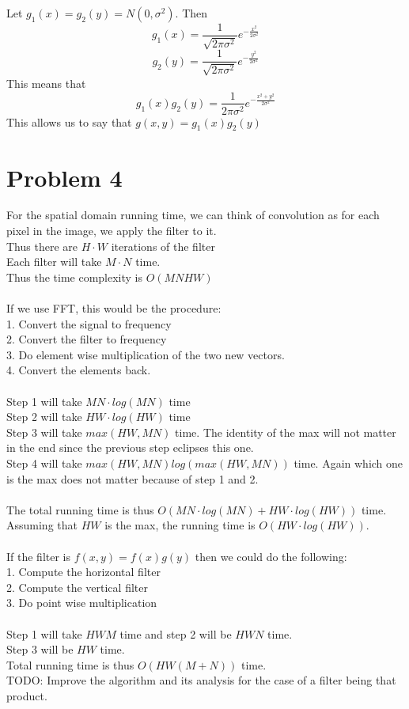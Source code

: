 \documentclass[11pt,psfig]{article}
\begin{document}
Let $g_1(x) = g_2(y) = N(0,\sigma^2)$. Then
\[
g_1(x) = \frac{1}{\sqrt{2\pi \sigma^2}} e^{-\frac{x^2}{2\sigma^2}}
\]
\[
g_2(y) = \frac{1}{\sqrt{2\pi \sigma^2}} e^{-\frac{y^2}{2\sigma^2}}
\]
This means that
\[
g_1(x)g_2(y) = \frac{1}{2\pi \sigma^2} e^{-\frac{x^2 + y^2}{2\sigma^2}}
\]
This allows us to say that $g(x,y) = g_1(x)g_2(y)$

\section*{Problem 4}

For the spatial domain running time, we can think of convolution as for each pixel in the image, we apply the filter to it. \\
Thus there are $H \cdot W$ iterations of the filter\\
Each filter will take $M \cdot N$ time. \\
Thus the time complexity is $O(MNHW)$\\
\\
If we use FFT, this would be the procedure:\\
1. Convert the signal to frequency\\
2. Convert the filter to frequency \\
3. Do element wise multiplication of the two new vectors. \\
4. Convert the elements back. \\
\\
Step 1 will take $MN \cdot log(MN)$ time\\
Step 2 will take $HW \cdot log(HW)$ time\\
Step 3 will take $max(HW,MN)$ time. The identity of the max will not matter in the end since the previous step eclipses this one. \\
Step 4 will take $max(HW,MN) log( max(HW, MN) )$ time. Again which one is the max does not matter because of step 1 and 2. \\
\\
The total running time is thus $O(MN \cdot log(MN) + HW \cdot log(HW) )$ time. \\
Assuming that $HW$ is the max, the running time is $O(HW \cdot log(HW))$. \\
\\
If the filter is $f(x,y) = f(x)g(y)$ then we could do the following:\\
1. Compute the horizontal filter\\
2. Compute the vertical filter\\
3. Do point wise multiplication \\
\\
Step 1 will take $HWM$ time and step 2 will be $HWN$ time. \\
Step 3 will be $HW$ time. \\
Total running time is thus $O( HW(M+N) )$ time. \\
TODO: Improve the algorithm and its analysis for the case of a filter being that product. 
\end{document}
